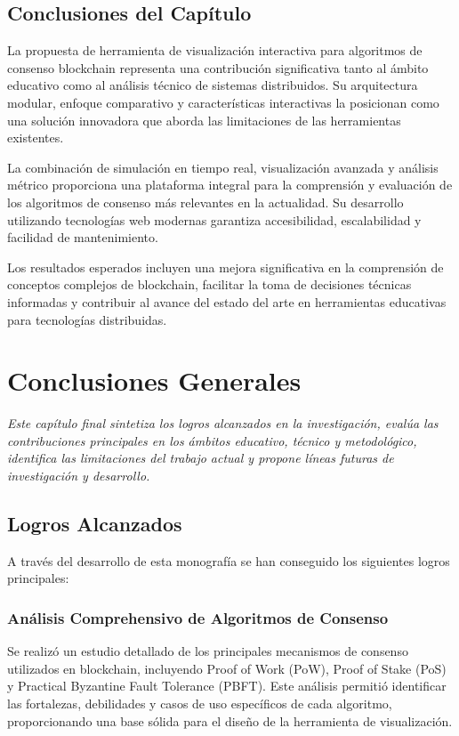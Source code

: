 \documentclass[spanish,12pt,letterpaper]{report}
\begin{document}
\section{Conclusiones del Capítulo}

La propuesta de herramienta de visualización interactiva para algoritmos de consenso blockchain representa una contribución significativa tanto al ámbito educativo como al análisis técnico de sistemas distribuidos. Su arquitectura modular, enfoque comparativo y características interactivas la posicionan como una solución innovadora que aborda las limitaciones de las herramientas existentes.

La combinación de simulación en tiempo real, visualización avanzada y análisis métrico proporciona una plataforma integral para la comprensión y evaluación de los algoritmos de consenso más relevantes en la actualidad. Su desarrollo utilizando tecnologías web modernas garantiza accesibilidad, escalabilidad y facilidad de mantenimiento.

Los resultados esperados incluyen una mejora significativa en la comprensión de conceptos complejos de blockchain, facilitar la toma de decisiones técnicas informadas y contribuir al avance del estado del arte en herramientas educativas para tecnologías distribuidas.

\chapter{Conclusiones Generales}

\textit{Este capítulo final sintetiza los logros alcanzados en la investigación, evalúa las contribuciones principales en los ámbitos educativo, técnico y metodológico, identifica las limitaciones del trabajo actual y propone líneas futuras de investigación y desarrollo.}
\newpage
\section{Logros Alcanzados}

A través del desarrollo de esta monografía se han conseguido los siguientes logros principales:

\subsection{Análisis Comprehensivo de Algoritmos de Consenso}

Se realizó un estudio detallado de los principales mecanismos de consenso utilizados en blockchain, incluyendo Proof of Work (PoW), Proof of Stake (PoS) y Practical Byzantine Fault Tolerance (PBFT). Este análisis permitió identificar las fortalezas, debilidades y casos de uso específicos de cada algoritmo, proporcionando una base sólida para el diseño de la herramienta de visualización.
\end{document}
